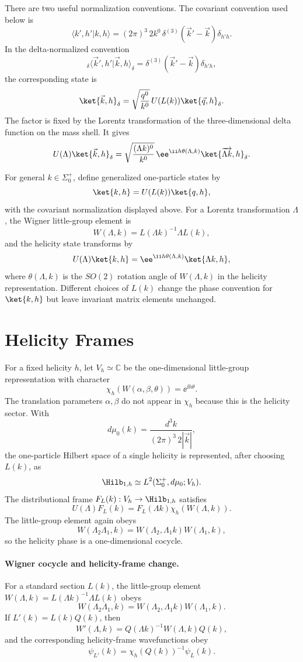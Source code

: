 There are two useful normalization conventions. The covariant convention used
below is
\[
  \langle k',h'|k,h\rangle
  =
  (2\pi)^3\,2k^0\,\delta^{(3)}(\vec k'-\vec k)\delta_{h'h}.
\]
In the delta-normalized convention
\[
  {}_\delta\!\langle \vec k',h'|\vec k,h\rangle_\delta
  =
  \delta^{(3)}(\vec k'-\vec k)\delta_{h'h},
\]
the corresponding state is
\[
  \ket{\vec k,h}_\delta
  =
  \sqrt{\frac{q^0}{k^0}}\,
  U(L(k))\ket{\vec q,h}_\delta .
\]
The factor is fixed by the Lorentz transformation of the three-dimensional
delta function on the mass shell. It gives
\[
  U(\Lambda)\ket{\vec k,h}_\delta
  =
  \sqrt{\frac{(\Lambda k)^0}{k^0}}\,
  \ee^{\ii h\theta(\Lambda,k)}
  \ket{\overrightarrow{\Lambda k},h}_\delta .
\]

For general \(k\in\Sigma_0^+\), define generalized one-particle states by
\[
  \ket{k,h}=U(L(k))\ket{q,h},
\]
with the covariant normalization displayed above.
For a Lorentz transformation \(\Lambda\), the Wigner little-group element is
\[
  W(\Lambda,k)=L(\Lambda k)^{-1}\Lambda L(k),
\]
and the helicity state transforms by
\[
  U(\Lambda)\ket{k,h}
  =
  \ee^{\ii h\theta(\Lambda,k)}\ket{\Lambda k,h},
\]
where \(\theta(\Lambda,k)\) is the \(SO(2)\) rotation angle of
\(W(\Lambda,k)\) in the helicity representation. Different choices of
\(L(k)\) change the phase convention for \(\ket{k,h}\) but leave invariant
matrix elements unchanged.

\section{Helicity Frames}

For a fixed helicity \(h\), let \(V_h\simeq \mathbb C\) be the one-dimensional
little-group representation with character
\[
  \chi_h(W(\alpha,\beta,\theta))=\ee^{\ii h\theta}.
\]
The translation parameters \(\alpha,\beta\) do not appear in \(\chi_h\)
because this is the helicity sector. With
\[
  d\mu_0(k)=\frac{d^3k}{(2\pi)^3\,2|\vec k|},
\]
the one-particle Hilbert space of a single helicity is represented, after
choosing \(L(k)\), as
\[
  \Hilb_{1,h}\simeq L^2(\Sigma_0^+,d\mu_0;V_h).
\]
The distributional frame \(F_L(k):V_h\to\Hilb_{1,h}\) satisfies
\[
  U(\Lambda)F_L(k)
  =
  F_L(\Lambda k)\chi_h(W(\Lambda,k)).
\]
The little-group element again obeys
\[
  W(\Lambda_2\Lambda_1,k)
  =
  W(\Lambda_2,\Lambda_1 k)W(\Lambda_1,k),
\]
so the helicity phase is a one-dimensional cocycle.

\paragraph{Wigner cocycle and helicity-frame change.}
  For a standard section \(L(k)\), the little-group element
  \(W(\Lambda,k)=L(\Lambda k)^{-1}\Lambda L(k)\) obeys
  \[
    W(\Lambda_2\Lambda_1,k)
    =
    W(\Lambda_2,\Lambda_1 k)W(\Lambda_1,k).
  \]
  If \(L'(k)=L(k)Q(k)\), then
  \[
    W'(\Lambda,k)=Q(\Lambda k)^{-1}W(\Lambda,k)Q(k),
  \]
  and the corresponding helicity-frame wavefunctions obey
  \[
    \psi_{L'}(k)=\chi_h(Q(k))^{-1}\psi_L(k).
  \]

